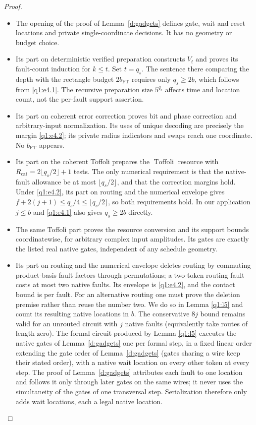\begin{proof}
\begin{itemize}
\item The opening of the proof of Lemma~\ref{d:gadgets} defines gate, wait and reset locations and private single-coordinate decisions. It has no geometry or budget choice.
\item Its part on deterministic verified preparation constructs \(V_{t}\) and proves its fault-count induction for \(k\le t\). Set \(t=q_{s}\). The sentence there comparing the depth with the rectangle budget \(2b_{\mathrm{FT}}\) requires only \(q_{s}\ge 2b\), which follows from \eqref{q1:e4.1}. The recursive preparation size \(5^{q_{s}}\) affects time and location count, not the per-fault support assertion.
\item Its part on coherent error correction proves bit and phase correction and arbitrary-input normalization. Its uses of unique decoding are precisely the margin \eqref{q1:e4.2}; its private radius indicators and swaps reach one coordinate. No \(b_{\mathrm{FT}}\) appears.
\item Its part on the coherent Toffoli prepares the \(\operatorname{Toffoli}\) resource with \(R_{\mathrm{cat}}=2 \lfloor q_{s}/2\rfloor+1\) tests. The only numerical requirement is that the native-fault allowance be at most \(\lfloor q_{s}/2\rfloor\), and that the correction margins hold. Under \eqref{q1:e4.2}, its part on routing and the numerical envelope gives \(f+2(j+1)\le q_{s}/4\le \lfloor q_{s}/2\rfloor\), so both requirements hold. In our application \(j\le b\) and \eqref{q1:e4.1} also gives \(q_{s}\ge 2b\) directly.
\item The same Toffoli part proves the resource conversion and its support bounds coordinatewise, for arbitrary complex input amplitudes. Its gates are exactly the listed real native gates, independent of any schedule geometry.
\item Its part on routing and the numerical envelope deletes routing by commuting product-basis fault factors through permutations; a two-token routing fault costs at most two native faults. Its envelope is \eqref{q1:e4.2}, and the contact bound is per fault. For an alternative routing one must prove the deletion premise rather than reuse the number two. We do so in Lemma \ref{q1:l5} and count its resulting native locations in \(b\). The conservative \(8j\) bound remains valid for an unrouted circuit with \(j\) native faults (equivalently take routes of length zero). The formal circuit produced by Lemma \ref{q1:l5} executes the native gates of Lemma~\ref{d:gadgets} one per formal step, in a fixed linear order extending the gate order of Lemma~\ref{d:gadgets} (gates sharing a wire keep their stated order), with a native wait location on every other token at every step. The proof of Lemma~\ref{d:gadgets} attributes each fault to one location and follows it only through later gates on the same wires; it never uses the simultaneity of the gates of one transversal step. Serialization therefore only adds wait locations, each a legal native location.

\end{itemize}
\end{proof}
